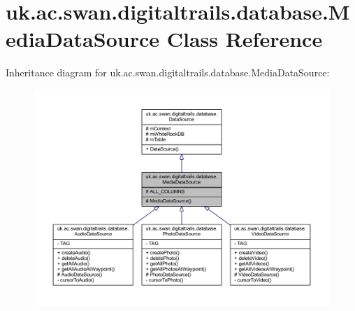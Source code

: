 \hypertarget{classuk_1_1ac_1_1swan_1_1digitaltrails_1_1database_1_1_media_data_source}{\section{uk.\+ac.\+swan.\+digitaltrails.\+database.\+Media\+Data\+Source Class Reference}
\label{classuk_1_1ac_1_1swan_1_1digitaltrails_1_1database_1_1_media_data_source}
}


Inheritance diagram for uk.\+ac.\+swan.\+digitaltrails.\+database.\+Media\+Data\+Source\+:
\nopagebreak
\begin{figure}[H]
\begin{center}
\leavevmode
\includegraphics[width=350pt]{classuk_1_1ac_1_1swan_1_1digitaltrails_1_1database_1_1_media_data_source__inherit__graph}
\end{center}
\end{figure}



